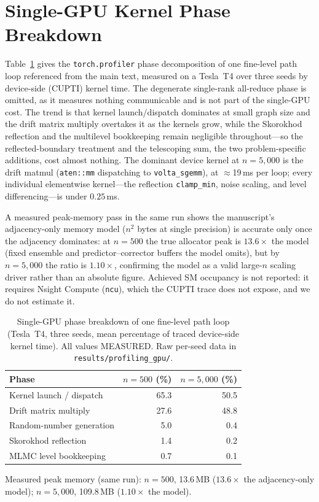 \documentclass[10pt,twocolumn]{article}
\begin{document}
\section{Single-GPU Kernel Phase Breakdown}

Table~\ref{tab:phase_breakdown} gives the \texttt{torch.profiler} phase decomposition of one
fine-level path loop referenced from the main text, measured on a Tesla~T4 over three seeds by
device-side (CUPTI) kernel time. The degenerate single-rank all-reduce phase is omitted, as it
measures nothing communicable and is not part of the single-GPU cost. The trend is that kernel
launch/dispatch dominates at small graph size and the drift matrix multiply overtakes it as the
kernels grow, while the Skorokhod reflection and the multilevel bookkeeping remain negligible
throughout---so the reflected-boundary treatment and the telescoping sum, the two
problem-specific additions, cost almost nothing. The dominant device kernel at $n{=}5{,}000$ is
the drift matmul (\texttt{aten::mm} dispatching to \texttt{volta\_sgemm}), at $\approx$19\,ms per
loop; every individual elementwise kernel---the reflection \texttt{clamp\_min}, noise scaling,
and level differencing---is under $0.25$\,ms.

A measured peak-memory pass in the same run shows the manuscript's adjacency-only memory model
($n^2$ bytes at single precision) is accurate only once the adjacency dominates: at $n{=}500$ the
true allocator peak is $13.6\times$ the model (fixed ensemble and predictor--corrector buffers
the model omits), but by $n{=}5{,}000$ the ratio is $1.10\times$, confirming the model as a valid
large-$n$ scaling driver rather than an absolute figure. Achieved SM occupancy is not reported:
it requires Nsight Compute (\texttt{ncu}), which the CUPTI trace does not expose, and we do not
estimate it.

\begin{table}[!t]
\caption{Single-GPU phase breakdown of one fine-level path loop (Tesla~T4, three seeds, mean
percentage of traced device-side kernel time). All values MEASURED. Raw per-seed data in
\texttt{results/profiling\_gpu/}.}
\label{tab:phase_breakdown}
\centering\small
\begin{tabular}{@{}l r r@{}}
\toprule
Phase & $n{=}500$ (\%) & $n{=}5{,}000$ (\%) \\
\midrule
Kernel launch / dispatch     & 65.3 & 50.5 \\
Drift matrix multiply        & 27.6 & 48.8 \\
Random-number generation     & 5.0  & 0.4  \\
Skorokhod reflection         & 1.4  & 0.2  \\
MLMC level bookkeeping       & 0.7  & 0.1  \\
\bottomrule
\end{tabular}
\vspace{2pt}
\footnotesize Measured peak memory (same run): $n{=}500$, 13.6\,MB ($13.6\times$ the
adjacency-only model); $n{=}5{,}000$, 109.8\,MB ($1.10\times$ the model).
\end{table}
\end{document}
